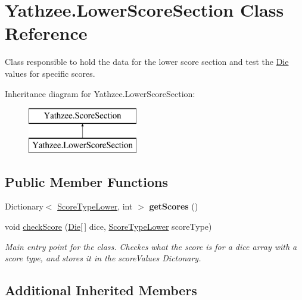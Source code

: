 \hypertarget{class_yathzee_1_1_lower_score_section}{}\section{Yathzee.\+Lower\+Score\+Section Class Reference}
\label{class_yathzee_1_1_lower_score_section}


Class responsible to hold the data for the lower score section and test the \hyperlink{class_yathzee_1_1_die}{Die} values for specific scores.  


Inheritance diagram for Yathzee.\+Lower\+Score\+Section\+:\begin{figure}[H]
\begin{center}
\leavevmode
\includegraphics[height=2.000000cm]{class_yathzee_1_1_lower_score_section}
\end{center}
\end{figure}
\subsection*{Public Member Functions}
\begin{DoxyCompactItemize}
\item 
Dictionary$<$ \hyperlink{namespace_yathzee_ae036ce06cdf75e284ea1cd78a457ef70}{Score\+Type\+Lower}, int $>$ {\bfseries get\+Scores} ()\hypertarget{class_yathzee_1_1_lower_score_section_a427d65a33219f4e2d4965cc56f18e1a6}{}\label{class_yathzee_1_1_lower_score_section_a427d65a33219f4e2d4965cc56f18e1a6}

\item 
void \hyperlink{class_yathzee_1_1_lower_score_section_acd14498c43eb2c788e450269095a9b61}{check\+Score} (\hyperlink{class_yathzee_1_1_die}{Die}\mbox{[}$\,$\mbox{]} dice, \hyperlink{namespace_yathzee_ae036ce06cdf75e284ea1cd78a457ef70}{Score\+Type\+Lower} score\+Type)
\begin{DoxyCompactList}\small\item\em Main entry point for the class. Checkes what the score is for a dice array with a score type, and stores it in the score\+Values Dictonary. \end{DoxyCompactList}\end{DoxyCompactItemize}
\subsection*{Additional Inherited Members}


